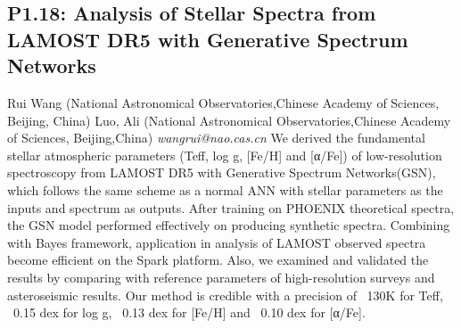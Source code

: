 \documentclass{report}
\begin{document}
\subsection*{P1.18: Analysis of Stellar Spectra from LAMOST DR5 with Generative Spectrum Networks}
\bigskip
Rui Wang (National Astronomical Observatories,Chinese Academy of Sciences, Beijing, China) \newline Luo, Ali (National Astronomical Observatories,Chinese Academy of Sciences, Beijing,China) \newline   \newline   \newline  \newline  \newline\newline
{\it wangrui@nao.cas.cn}\newline
\newline\newline
We derived the fundamental stellar atmospheric parameters (Teff, log g, [Fe/H] and [α/Fe]) of low-resolution spectroscopy from LAMOST DR5 with Generative Spectrum Networks(GSN), which follows the same scheme as a normal ANN with stellar parameters as the inputs and spectrum as outputs. After training on PHOENIX theoretical spectra, the GSN model performed effectively on producing synthetic spectra. Combining with Bayes framework,  application in analysis of LAMOST observed spectra become efficient on the Spark platform. Also, we examined and validated the results by comparing with reference parameters of high-resolution surveys and asteroseismic results. Our method is credible with a precision of ~130K for Teff, ~0.15 dex for log g, ~0.13 dex for [Fe/H] and ~0.10 dex for [α/Fe].\newline
\newpage
\end{document}
